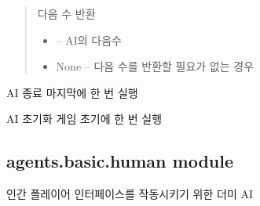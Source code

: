\documentclass[letterpaper,10pt,english]{sphinxmanual}
\begin{document}
\begin{fulllineitems}
\begin{fulllineitems}
\begin{quote}
\begin{description}
다음 수 반환
\begin{itemize}
\item {} 
 -- AI의 다음수

\item {} 
None -- 다음 수를 반환할 필요가 없는 경우

\end{itemize}


\end{description}\end{quote}

\end{fulllineitems}


\begin{fulllineitems}
\label{\detokenize{agents.basic:agents.basic.debug_agent.MalfunctionAgent.close}}
AI 종료
마지막에 한 번 실행

\end{fulllineitems}


\begin{fulllineitems}
\label{\detokenize{agents.basic:agents.basic.debug_agent.MalfunctionAgent.reset}}
AI 초기화
게임 초기에 한 번 실행

\end{fulllineitems}


\end{fulllineitems}



\subsection{agents.basic.human module}
\label{\detokenize{agents.basic:agents-basic-human-module}}\label{\detokenize{agents.basic:module-agents.basic.human}}
인간 플레이어 인터페이스를 작동시키기 위한 더미 AI
\end{document}
